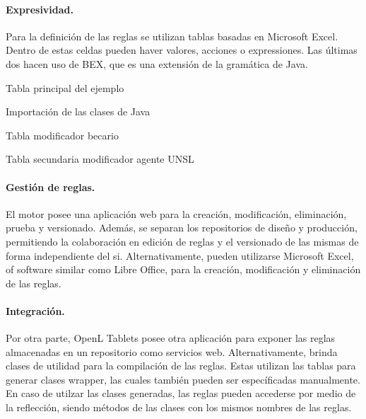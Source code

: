 \paragraph{Expresividad.}
Para la definición de las reglas se utilizan tablas basadas en Microsoft Excel. Dentro de estas celdas pueden haver valores, acciones o expressiones. Las últimas dos hacen uso de BEX, que es una extensión de la gramática de Java.

\begin{table}[!ht]
	
	\caption{Tabla principal del ejemplo}
\end{table}

\begin{table}[!ht]
	
	\caption{Importación de las clases de Java}
	\label{tab:openl_java_import}
\end{table}

\begin{table}[!ht]
	
	\caption{Tabla modificador becario}
\end{table}

\begin{table}[!ht]
	
	\caption{Tabla secundaria modificador agente UNSL}
\end{table}

\paragraph{Gestión de reglas.}
El motor posee una aplicación web para la creación, modificación, eliminación, prueba y versionado. Además, se separan los repositorios de diseño y producción, permitiendo la colaboración en edición de reglas y el versionado de las mismas de forma independiente del \acrshort{si}. Alternativamente, pueden utilizarse Microsoft Excel, of software similar como Libre Office, para la creación, modificación y eliminación de las reglas.

\paragraph{Integración.}
Por otra parte, OpenL Tablets posee otra aplicación para exponer las reglas almacenadas en un repositorio como servicios web. Alternativamente, brinda clases de utilidad para la compilación de las reglas. Estas utilizan las tablas para generar clases wrapper, las cuales también pueden ser específicadas manualmente. En caso de utilzar las clases generadas, las reglas pueden accederse por medio de la reflección, siendo métodos de las clases con los mismos nombres de las reglas.

